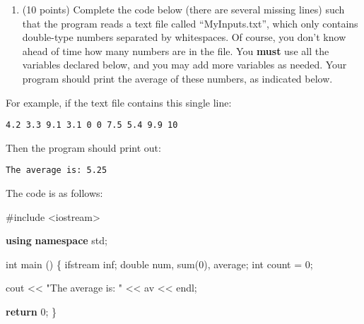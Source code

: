 \documentclass[
]{article}
\newenvironment{Shaded}{}{}
\newcommand{\ControlFlowTok}[1]{\textcolor[rgb]{0.00,0.44,0.13}{\textbf{#1}}}
\newcommand{\DataTypeTok}[1]{\textcolor[rgb]{0.56,0.13,0.00}{#1}}
\newcommand{\DecValTok}[1]{\textcolor[rgb]{0.25,0.63,0.44}{#1}}
\newcommand{\ImportTok}[1]{#1}
\newcommand{\KeywordTok}[1]{\textcolor[rgb]{0.00,0.44,0.13}{\textbf{#1}}}
\newcommand{\NormalTok}[1]{#1}
\newcommand{\PreprocessorTok}[1]{\textcolor[rgb]{0.74,0.48,0.00}{#1}}
\newcommand{\StringTok}[1]{\textcolor[rgb]{0.25,0.44,0.63}{#1}}
\providecommand{\tightlist}{%
  \setlength{\itemsep}{0pt}\setlength{\parskip}{0pt}}
\begin{document}
\begin{verbatim}
\end{verbatim}

\pagebreak

\begin{enumerate}
\def\labelenumi{\arabic{enumi}.}
\setcounter{enumi}{3}
\tightlist
\item
  (10 points) Complete the code below (there are several missing lines)
  such that the program reads a text file called ``MyInputs.txt'', which
  only contains double-type numbers separated by whitespaces. Of course,
  you don't know ahead of time how many numbers are in the file. You
  \textbf{must} use all the variables declared below, and you may add
  more variables as needed. Your program should print the average of
  these numbers, as indicated below.
\end{enumerate}

For example, if the text file contains this single line:

\begin{verbatim}
4.2 3.3 9.1 3.1 0 0 7.5 5.4 9.9 10
\end{verbatim}

Then the program should print out:

\begin{verbatim}
The average is: 5.25
\end{verbatim}

The code is as follows:

\begin{Shaded}
\begin{Highlighting}[]
\PreprocessorTok{\#include }\ImportTok{\textless{}iostream\textgreater{}}


\KeywordTok{using} \KeywordTok{namespace}\NormalTok{ std;}

\DataTypeTok{int}\NormalTok{ main ()}
\NormalTok{\{}
\NormalTok{   ifstream inf;}
   \DataTypeTok{double}\NormalTok{ num, sum(}\DecValTok{0}\NormalTok{), average;}
   \DataTypeTok{int}\NormalTok{ count = }\DecValTok{0}\NormalTok{;}











\NormalTok{   cout \textless{}\textless{} }\StringTok{"The average is: "}\NormalTok{ \textless{}\textless{} av \textless{}\textless{} endl;}



   \ControlFlowTok{return} \DecValTok{0}\NormalTok{;}
\NormalTok{\}}
\end{Highlighting}
\end{Shaded}
\end{document}

